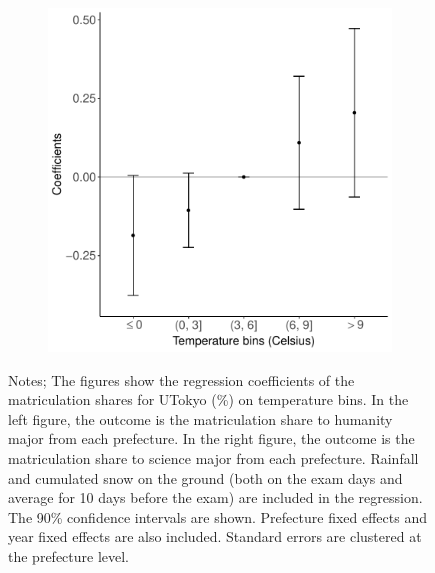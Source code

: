 \documentclass[10pt, pdfmx,hiresbb]{beamer}
\begin{document}
\begin{frame}
\begin{figure}
\begin{minipage}{0.43\textwidth}
\begin{figure}[h]
        \includegraphics[width = \textwidth]{../Output/images/reg_major_4.pdf}
        \centering
      \end{figure}
    \end{minipage}
    \tiny
    \begin{tablenotes}
    \item Notes;
      The figures show the regression coefficients of the matriculation shares for UTokyo (\%) on temperature bins.
      In the left figure, the outcome is the matriculation share to humanity major from each prefecture.
      In the right figure, the outcome is the matriculation share to science major from each prefecture.
      Rainfall and cumulated snow on the ground (both on the exam days and average for 10 days before the exam) are included in the regression.
      The 90\% confidence intervals are shown.
      Prefecture fixed effects and year fixed effects are also included.
      Standard errors are clustered at the prefecture level.
    \end{tablenotes}
  \end{figure}
\end{frame}
\end{document}

